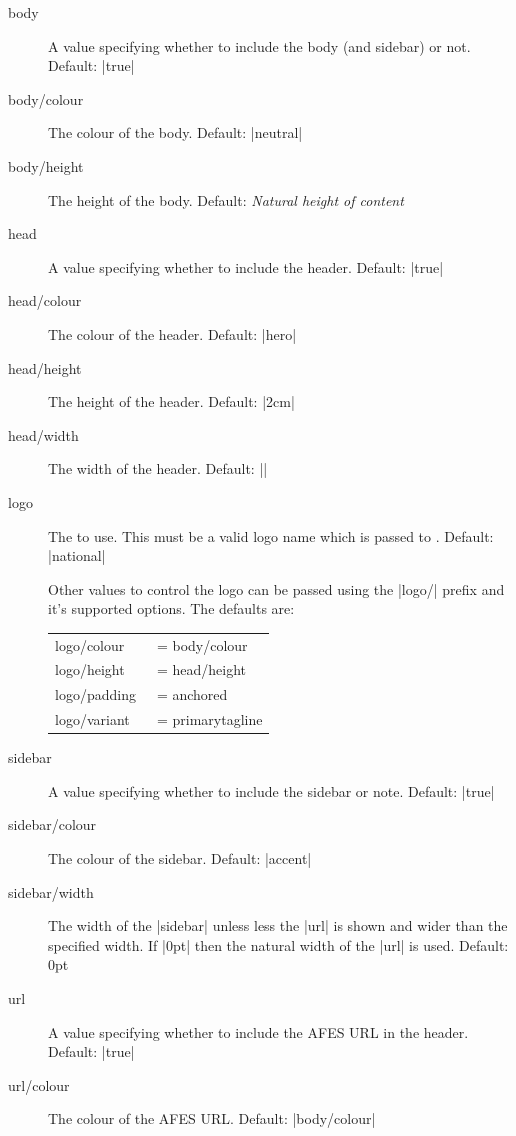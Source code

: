 \documentclass[a4paper]{l3doc}
\begin{document}
\begin{description}
  \item[body] A  value specifying whether to include the body
    (and sidebar) or not. Default: |true|
  \item[body/colour] The colour of the body. Default: |neutral|
  \item[body/height] The height of the body. Default: \emph{Natural height of
    content}
  \item[head] A  value specifying whether to include the header.
    Default: |true|
  \item[head/colour] The colour of the header. Default: |hero|
  \item[head/height] The height of the header. Default: |2cm|
  \item[head/width] The width of the header. Default: |\linewidth|
  \item[logo] The  to use. This must be a valid logo name which is
    passed to . Default: |national|

    Other values to control the logo can be passed using the |logo/| prefix
    and it's supported options. The defaults are:

    \begin{tabular}{@{}>{\ttfamily}l@{}>{\ttfamily}l@{}}
      logo/colour & = body/colour \\
      logo/height & = head/height \\
      logo/padding~ & = anchored \\
      logo/variant~ & = primarytagline \\
    \end{tabular}
      
  \item[sidebar] A  value specifying whether to include the
    sidebar or note. Default: |true|
  \item[sidebar/colour] The colour of the sidebar. Default: |accent|
  \item[sidebar/width] The width of the |sidebar| unless less the |url| is
    shown and wider than the specified width. If |0pt| then the natural
    width of the |url| is used. Default: 0pt
  \item[url] A  value specifying whether to include the AFES URL
    in the header. Default: |true|
  \item[url/colour] The colour of the AFES URL. Default: |body/colour|
\end{description}
\end{document}
